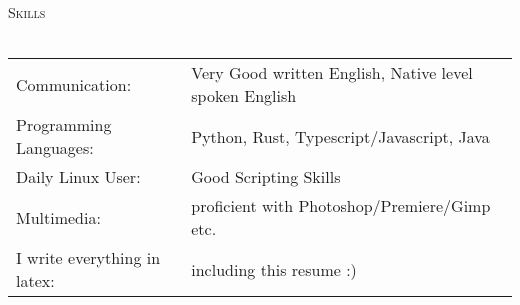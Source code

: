 \documentclass[a4paper]{article}
\newcommand{\lineunder} {
    \vspace*{-8pt} \\
    \hspace*{-18pt} \hrulefill \\
}
\newcommand{\header} [1] {
    {\hspace*{-18pt}\vspace*{6pt} \textsc{#1}}
    \vspace*{-6pt} \lineunder
}
\begin{document}
\header{Skills}
\begin{tabular}{ l l }
	Communication:               & Very Good written English, Native level spoken English \\
	Programming Languages:       & Python, Rust, Typescript/Javascript, Java              \\
	Daily Linux User:            & Good Scripting Skills                                  \\
	Multimedia:                  & proficient with Photoshop/Premiere/Gimp etc.           \\
	I write everything in latex: & including this resume :)                               \\
\end{tabular}
\vspace{2mm}
\end{document}
